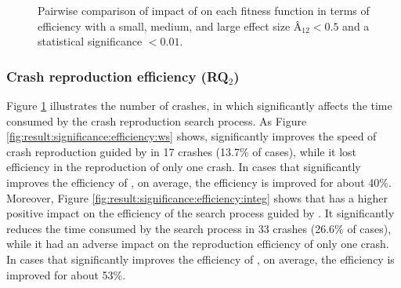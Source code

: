 \begin{figure}[t]
    \hfil 
    \hfil
    \caption{Pairwise comparison of impact of \bbc on each fitness function in terms of efficiency with a small, medium, and large effect size $\textit{\^{A}}_{12} < 0.5$ and a statistical significance $<0.01$.}
    \label{fig:result:significance:efficiency}
    \vspace{-1.5em}
\end{figure}
\vspace{-1em}
\subsubsection{Crash reproduction efficiency (RQ$_2$)}

Figure \ref{fig:result:significance:efficiency} illustrates the number of crashes, in which \bbc significantly affects the time consumed by the crash reproduction search process. As Figure \ref{fig:result:significance:efficiency:ws} shows, \bbc significantly improves the speed of crash reproduction guided by \WS in 17 crashes (13.7\% of cases), while it lost efficiency in the reproduction of only one crash. In cases that \bbc significantly improves the efficiency of \WS, on average, the efficiency is improved for about 40\%.
Moreover,  Figure \ref{fig:result:significance:efficiency:integ} shows that \bbc has a higher positive impact on the efficiency of the search process guided by \integ. It significantly reduces the time consumed by the search process in 33 crashes (26.6\% of cases), while it had an adverse impact on the reproduction efficiency of only one crash. In cases that \bbc significantly improves the efficiency of \integ, on average, the efficiency is improved for about 53\%.

